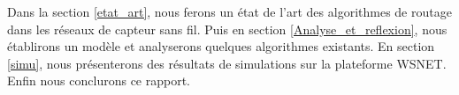 Dans la section \ref{etat_art}, nous ferons un état de l'art des algorithmes de routage dans les réseaux de capteur sans fil. Puis en section \ref{Analyse_et_reflexion}, nous établirons un modèle et analyserons quelques algorithmes existants. En section \ref{simu}, nous présenterons des résultats de simulations sur la plateforme WSNET. Enfin nous conclurons ce rapport.


